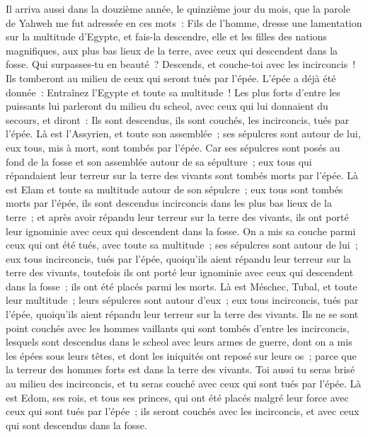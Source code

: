 \begin{multicols}{2}
Il arriva aussi dans la douzième année, le quinzième jour du mois, que la parole de Yahweh me fut adressée en ces mots~:
Fils de l'homme, dresse une lamentation sur la multitude d'Egypte, et fais-la descendre, elle et les filles des nations magnifiques, aux plus bas lieux de la terre, avec ceux qui descendent dans la fosse.
Qui surpasses-tu en beauté~? Descends, et couche-toi avec les incirconcis~!
Ils tomberont au milieu de ceux qui seront tués par l'épée. L'épée a déjà été donnée~: Entraînez l'Egypte et toute sa multitude~!
Les plus forts d'entre les puissants lui parleront du milieu du scheol, avec ceux qui lui donnaient du secours, et diront~: Ils sont descendus, ils sont couchés, les incirconcis, tués par l'épée.
Là est l'Assyrien, et toute son assemblée~; ses sépulcres sont autour de lui, eux tous, mis à mort, sont tombés par l'épée.
Car ses sépulcres sont posés au fond de la fosse et son assemblée autour de sa sépulture~; eux tous qui répandaient leur terreur sur la terre des vivants sont tombés morts par l'épée.
Là est Elam et toute sa multitude autour de son sépulcre~; eux tous sont tombés morts par l'épée, ils sont descendus incirconcis dans les plus bas lieux de la terre~; et après avoir répandu leur terreur sur la terre des vivants, ils ont porté leur ignominie avec ceux qui descendent dans la fosse.
On a mis sa couche parmi ceux qui ont été tués, avec toute sa multitude~; ses sépulcres sont autour de lui~; eux tous incirconcis, tués par l'épée, quoiqu'ils aient répandu leur terreur sur la terre des vivants, toutefois ils ont porté leur ignominie avec ceux qui descendent dans la fosse~; ils ont été placés parmi les morts.
Là est Méschec, Tubal, et toute leur multitude~; leurs sépulcres sont autour d'eux~; eux tous incirconcis, tués par l'épée, quoiqu'ils aient répandu leur terreur sur la terre des vivants.
Ils ne se sont point couchés avec les hommes vaillants qui sont tombés d'entre les incirconcis, lesquels sont descendus dans le scheol avec leurs armes de guerre, dont on a mis les épées sous leurs têtes, et dont les iniquités ont reposé sur leurs os~; parce que la terreur des hommes forts est dans la terre des vivants.
Toi aussi tu seras brisé au milieu des incirconcis, et tu seras couché avec ceux qui sont tués par l'épée.
Là est Edom, ses rois, et tous ses princes, qui ont été placés malgré leur force avec ceux qui sont tués par l'épée~; ils seront couchés avec les incirconcis, et avec ceux qui sont descendus dans la fosse.

\end{multicols}
